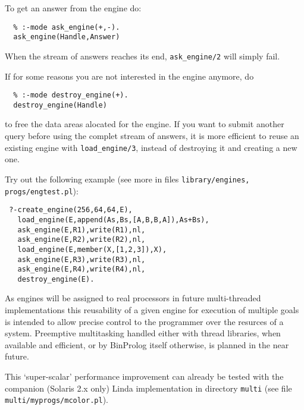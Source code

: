 \documentclass{article}
\begin{document}
To get an answer from the engine do:
\begin{verbatim}
  % :-mode ask_engine(+,-).
  ask_engine(Handle,Answer)
\end{verbatim}


When the stream of answers reaches its end, {\tt ask\_engine/2}
will simply fail.

If for some reasons you are not interested in the engine anymore,
do

\begin{verbatim}
  % :-mode destroy_engine(+).
  destroy_engine(Handle)
\end{verbatim}

{\flushleft to} free the data areas alocated for the engine.
If you want to submit another query before using the
complet stream of answers, it is more efficient to reuse an
existing engine with {\tt load\_engine/3}, instead of
destroying it and creating a new one.

Try out the following example (see more in files 
{\tt library/engines, progs/engtest.pl}):

\begin{verbatim}
 ?-create_engine(256,64,64,E),
   load_engine(E,append(As,Bs,[A,B,B,A]),As+Bs),
   ask_engine(E,R1),write(R1),nl,
   ask_engine(E,R2),write(R2),nl,
   load_engine(E,member(X,[1,2,3]),X),
   ask_engine(E,R3),write(R3),nl,
   ask_engine(E,R4),write(R4),nl,
   destroy_engine(E).
\end{verbatim}

As engines will be assigned to real processors in future
multi-threaded implementations this reusability of a
given engine for execution of multiple goals is intended
to allow precise control to the programmer over the
resurces of a system. Preemptive multitasking
handled either with thread libraries, when available and efficient,
or by BinProlog itself otherwise, is planned in the near future.

This `super-scalar' performance improvement
can already be tested with the companion (Solaris 2.x only)
Linda implementation in directory {\tt multi} (see file
{\tt multi/myprogs/mcolor.pl}).
\end{document}
